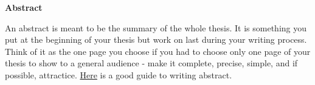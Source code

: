 \newpage
\thispagestyle{plain}
\begin{center}
\huge
\textbf{Abstract}
\end{center}
\vspace{1cm}
\normalsize
An abstract is meant to be the summary of the whole thesis. It is something you put at the beginning of your thesis but work on last during your writing process. Think of it as the one page you choose if you had to choose only one page of your thesis to show to a general audience - make it complete, precise, simple, and if possible, attractice. \href{https://services.unimelb.edu.au/__data/assets/pdf_file/0007/471274/Writing_an_Abstract_Update_051112.pdf}{Here} is a good guide to writing abstract.
  
